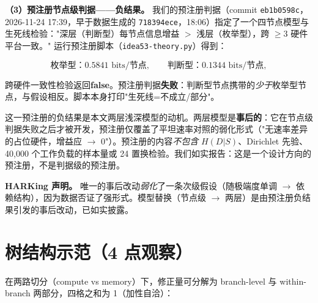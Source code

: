 \documentclass[10pt]{article}
\begin{document}
\textbf{（3）预注册节点级判据——负结果。} 我们的预注册判据（commit \texttt{eb1b0598c}，2026-11-24 17:39，早于数据生成的 \texttt{718394ece}，18:06）指定了一个四节点模型与生死线检验："深层（判断型）每节点信息增益 $>$ 浅层（枚举型），跨 $\geq 3$ 硬件平台一致。" 运行预注册脚本（\texttt{idea53-theory.py}）得到：

\[
\text{枚举型：} 0.5841 \text{ bits/节点}, \qquad \text{判断型：} 0.1344 \text{ bits/节点},
\]

跨硬件一致性检验返回\textbf{false}。预注册判据\textbf{失败}：判断型节点携带的\emph{少于}枚举型节点，与假设相反。脚本本身打印"生死线=不成立/部分"。

这一预注册的负结果是本文两层浅深模型的动机。两层模型是\textbf{事后的}：它在节点级判据失败之后才被开发，预注册仅覆盖了平坦速率对照的弱化形式（"无速率差异的占位硬件，增益应 $\rightarrow$ 0"）。预注册的内容\emph{不包含} $H(D|S)$、Dirichlet 先验、40,000 个工作负载的样本量或 24 置换检验。我们如实报告：这是一个设计方向的预注册，不是判据级的预注册。

\textbf{HARKing 声明。} 唯一的事后改动\emph{弱化}了一条次级假设（随极端度单调 $\rightarrow$ 依赖结构），因为数据否证了强形式。模型替换（节点级 $\rightarrow$ 两层）是由预注册负结果引发的事后改动，已如实披露。

\section{树结构示范（4 点观察）}\label{tree-demonstration-a-4-point-observation}

在两路切分（compute vs memory）下，修正量可分解为 branch-level 与 within-branch 两部分，四格之和为 1（加性自洽）：
\end{document}
